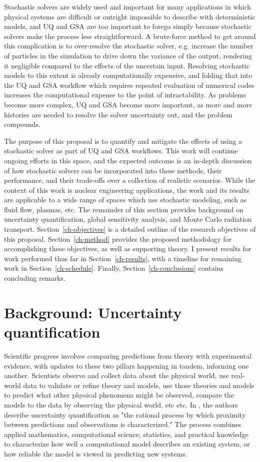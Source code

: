 Stochastic solvers are widely used and important for many applications in which physical systems are difficult or outright impossible to describe with deterministic models, and UQ and GSA are too important to forego simply because stochastic solvers make the process less straightforward. A brute-force method to get around this complication is to over-resolve the stochastic solver, e.g. increase the number of particles in the simulation to drive down the variance of the output, rendering it negligible compared to the effects of the uncertain input. Resolving stochastic models to this extent is already computationally expensive, and folding that into the UQ and GSA workflow which requires repeated evaluation of numerical codes increases the computational expense to the point of intractability. As problems become more complex, UQ and GSA become more important, as more and more histories are needed to resolve the solver uncertainty out, and the problem compounds. 

The purpose of this proposal is to quantify and mitigate the effects of using a stochastic solver as part of UQ and GSA workflows. This work will continue ongoing efforts in this space, and the expected outcome is an in-depth discussion of how stochastic solvers can be incorporated into these methods, their performance, and their trade-offs over a collection of realistic scenarios.
While the context of this work is nuclear engineering applications, the work and its results are applicable to a wide range of spaces which use stochastic modeling, such as fluid flow, plasmas, etc.
The remainder of this section provides background on uncertainty quantification, global sensitivity analysis, and Monte Carlo radiation transport. Section~\ref{ch-objectives} is a detailed outline of the research objectives of this proposal. Section~\ref{ch-method} provides the proposed methodology for accomplishing these objectives, as well as supporting theory. I present results for work performed thus far in Section~\ref{ch-results}, with a timeline for remaining work in Section~\ref{ch-schedule}. Finally, Section~\ref{ch-conclusions} contains concluding remarks.

\section{Background: Uncertainty quantification}\label{sec:background-uq}
Scientific progress involves comparing predictions from theory with experimental evidence, with updates to these two pillars happening in tandem, informing one another. Scientists observe and collect data about the physical world, use real-world data to validate or refine theory and models, use those theories and models to predict what other physical phenomena might be observed, compare the models to the data by observing the physical world, etc etc. In \cite{ghanem-uq-handbook}, the authors describe uncertainty quantification as "the rational process by which proximity between predictions and observations is characterized." The process combines applied mathematics, computational science, statistics, and practical knowledge to characterize how well a computational model describes an existing system, or how reliable the model is viewed in predicting new systems.


